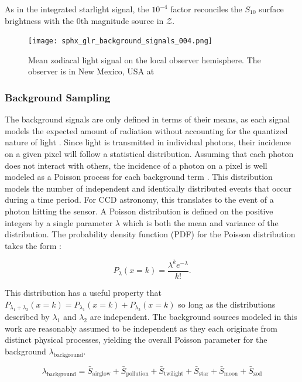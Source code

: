 As in the integrated starlight signal, the $10^{-4}$ factor reconciles the $S_{10}$ surface brightness with the 0th magnitude source in $\mathcal{Z}$. 

\begin{figure}[ht]
  \centering
  \texttt{[image: sphx\_glr\_background\_signals\_004.png]}
  \caption{Mean zodiacal light signal on the local observer hemisphere. The observer is in New Mexico, USA at
  \pogslla}
  \label{fig:zod_hemi}
\end{figure}

\subsubsection{Background Sampling}

The background signals are only defined in terms of their means, as each signal models the expected amount of radiation without accounting for the quantized nature of light \cite{krag2003}. Since light is transmitted in individual photons, their incidence on a given pixel will follow a statistical distribution. Assuming that each photon does not interact with others, the incidence of a photon on a pixel is well modeled as a Poisson process for each background term \cite{frueh2019notes}. This distribution models the number of independent and identically distributed events that occur during a time period. For CCD astronomy, this translates to the event of a photon hitting the sensor. A Poisson distribution is defined on the positive integers by a single parameter $\lambda$ which is both the mean and variance of the distribution. The probability density function (PDF) for the Poisson distribution takes the form \cite{frueh2019notes}:

\begin{equation} \label{eq:poisson_pdf}
  P_\lambda(x=k) = \frac{\lambda^k e^{-\lambda}}{k!}.
\end{equation}

This distribution has a useful property that $P_{\lambda_1 + \lambda_2}(x=k) = P_{\lambda_1}(x=k) + P_{\lambda_2}(x=k)$ so long as the distributions described by $\lambda_1$ and $\lambda_2$ are independent. The background sources modeled in this work are reasonably assumed to be independent as they each originate from distinct physical processes, yielding the overall Poisson parameter for the background $\lambda_\mathrm{background}$.

\begin{equation} \label{eq:background_poisson}
  \lambda_\mathrm{background} = \bar{S}_\mathrm{airglow} + \bar{S}_\mathrm{pollution} + \bar{S}_\mathrm{twilight} + \bar{S}_\mathrm{star} + \bar{S}_\mathrm{moon} + \bar{S}_\mathrm{zod}
\end{equation}

